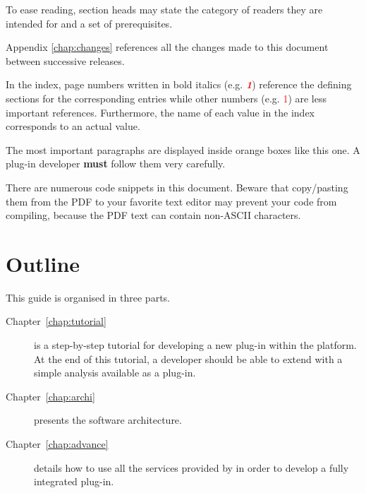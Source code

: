 To ease reading, section heads may state
the category of readers they are intended for and a set of prerequisites.

Appendix \ref{chap:changes} references all the changes made to
this document between successive \framac releases.

In the index, page numbers written in bold italics (e.g.
\textcolor{red}{\textit{\textbf{1}}}) reference the defining sections for the
corresponding entries while other numbers (e.g. \textcolor{red}{1}) are
less important references.
Furthermore, the name of each \caml value
in the index corresponds to an actual \framac value.


\begin{important}
  The most important paragraphs are displayed inside orange boxes like this one.
  A plug-in developer \textbf{must} follow them very carefully.
\end{important}

\begin{important}
  There are numerous code snippets in this document. Beware that copy/pasting
  them from the PDF to your favorite text editor may prevent your code from
  compiling, because the PDF text can contain non-ASCII characters.
\end{important}

\section{Outline}

This guide is organised in three parts.

\begin{description}
\item[Chapter~\ref{chap:tutorial}] is a step-by-step tutorial for developing a
  new plug-in within the \framac platform. At the end of this tutorial, a
  developer should be able to extend \framac with a simple analysis available
  as a \framac plug-in.
\item[Chapter~\ref{chap:archi}] presents the \framac software
  architecture.
\item[Chapter~\ref{chap:advance}] details how to use all the services provided
  by \framac in order to develop a fully integrated plug-in.
\end{description}
